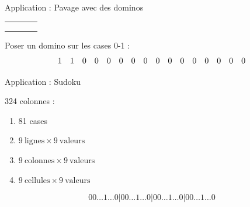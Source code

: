 \documentclass{beamer}
\begin{document}
\begin{frame}{Application : Pavage avec des dominos}

\begin{center}
  \begin{tabular}{|c|c|c|c|}
		\hline
   	\cellcolor{red} & \cellcolor{red} &  &  \\
		\hline
    	&  &  &  \\
		\hline
   	 &  &  &  \\
		\hline
   & &  &  \\
		\hline
\end{tabular}
\end{center}


Poser un domino sur les cases 0-1 :
\[
  \begin{array}{ c c c c c c c c c c c c c c c c }
	1 & 1 & 0 & 0 & 0 & 0 & 0 & 0 & 0 & 0 & 0 & 0 & 0 & 0 & 0 & 0 
  \end{array}
\]
\end{frame}



\begin{frame}{Application : Sudoku}

\begin{figure}[h]
\end{figure}

324 colonnes : 
\begin{enumerate}
\item 81 cases
\item $ 9~\textrm{lignes} \times 9~\textrm{valeurs}$ 
\item $ 9~\textrm{colonnes} \times 9~\textrm{valeurs}$ 
\item $ 9~\textrm{cellules} \times 9~\textrm{valeurs}$
\end{enumerate}

\[
	0 0 \dots 1 \dots 0 | 0 0 \dots 1 \dots 0 |
	0 0 \dots 1 \dots 0 | 0 0 \dots 1 \dots 0 
\]


\end{frame}
\end{document}
